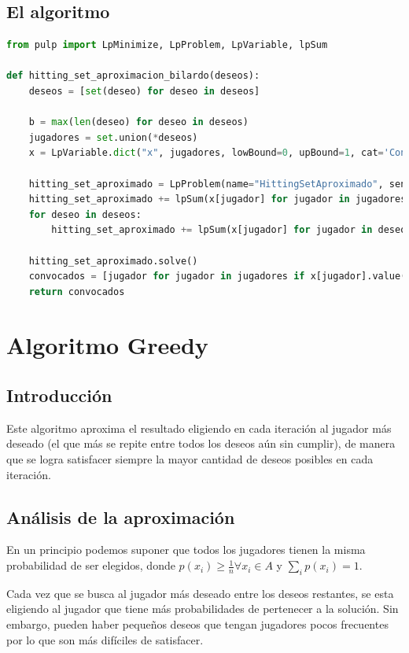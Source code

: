 \documentclass{estilo}
\begin{document}
\subsection{El algoritmo}

\begin{lstlisting}[language=Python]
from pulp import LpMinimize, LpProblem, LpVariable, lpSum

def hitting_set_aproximacion_bilardo(deseos):
    deseos = [set(deseo) for deseo in deseos]
    
    b = max(len(deseo) for deseo in deseos)
    jugadores = set.union(*deseos)
    x = LpVariable.dict("x", jugadores, lowBound=0, upBound=1, cat='Continuous')
    
    hitting_set_aproximado = LpProblem(name="HittingSetAproximado", sense=LpMinimize)
    hitting_set_aproximado += lpSum(x[jugador] for jugador in jugadores)
    for deseo in deseos:
        hitting_set_aproximado += lpSum(x[jugador] for jugador in deseo) >= 1
        
    hitting_set_aproximado.solve()
    convocados = [jugador for jugador in jugadores if x[jugador].value() >= 1/b]
    return convocados
\end{lstlisting}



\newpage

\section{Algoritmo Greedy}

\subsection{Introducción}

Este algoritmo aproxima el resultado eligiendo en cada iteración al jugador más deseado (el que más se repite entre todos los deseos aún sin cumplir), de manera que se logra satisfacer siempre la mayor cantidad de deseos posibles en cada iteración.

\subsection{Análisis de la aproximación}

En un principio podemos suponer que todos los jugadores tienen la misma probabilidad de ser elegidos, donde $p(x_i) \ge \frac{1}{n} \forall x_i \in A$ y  $\sum_i p(x_i) = 1$.

Cada vez que se busca al jugador más deseado entre los deseos restantes, se esta eligiendo al jugador que tiene más probabilidades de pertenecer a la solución. Sin embargo, pueden haber pequeños deseos que tengan jugadores pocos frecuentes por lo que son más difíciles de satisfacer.
\end{document}

